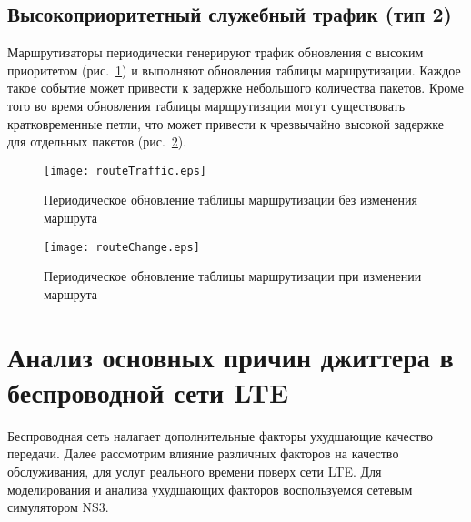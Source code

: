\subsection{Высокоприоритетный служебный трафик (тип 2) } \label{subsect2_1_7}
Маршрутизаторы периодически генерируют трафик обновления с высоким приоритетом (рис. \ref{img:routeTraffic}) и выполняют обновления таблицы маршрутизации. Каждое такое событие может привести к задержке небольшого количества пакетов. Кроме того во время обновления таблицы маршрутизации могут существовать кратковременные петли, что может привести к чрезвычайно высокой задержке для отдельных пакетов (рис. \ref{img:routeChange}).

\begin{figure} [!h]
  \center
\texttt{[image: routeTraffic.eps]}
  \caption{Периодическое обновление таблицы маршрутизации без изменения маршрута \cite{clark}}
  \label{img:routeTraffic}
\end{figure}
\begin{figure} [!h]
  \center
\texttt{[image: routeChange.eps]}
  \caption{Периодическое обновление таблицы маршрутизации при изменении маршрута \cite{clark}}
  \label{img:routeChange}
\end{figure}

\section{Анализ основных причин джиттера в беспроводной сети LTE} \label{sect2_2}
Беспроводная сеть налагает дополнительные факторы ухудшающие качество передачи. Далее рассмотрим влияние различных факторов на качество обслуживания, для услуг реального времени поверх сети LTE. Для моделирования и анализа ухудшающих факторов воспользуемся сетевым симулятором NS3.

